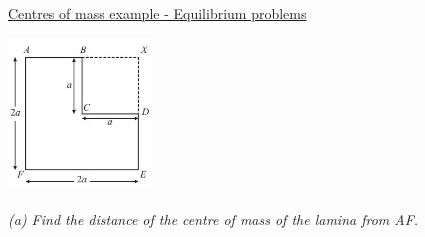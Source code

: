 \documentclass{article}[18pt]
\begin{document}
\newpage
\begin{center}
\underline{\huge Centres of mass example - Equilibrium problems}
\end{center}
\includegraphics[width=1.5in]{eq.jpg}\\
\\
\textit{(a) Find the distance of the centre of mass of the lamina from AF. }\\
\end{document}
